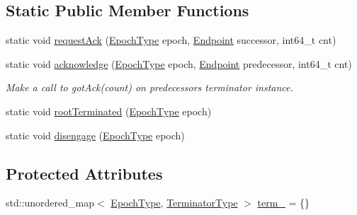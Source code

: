 \subsection*{Static Public Member Functions}
\begin{DoxyCompactItemize}
\item 
static void \hyperlink{structvt_1_1term_1_1ds_1_1_state_d_s_acdf0151492a1e35c6565c65b138e8ac9}{request\+Ack} (\hyperlink{namespacevt_a985a5adf291c34a3ca263b3378388236}{Epoch\+Type} epoch, \hyperlink{structvt_1_1term_1_1ds_1_1_state_d_s_aba302de614dd639f5d93f4f5b6dd6108}{Endpoint} successor, int64\+\_\+t cnt)
\item 
static void \hyperlink{structvt_1_1term_1_1ds_1_1_state_d_s_a60aafca7a5eef1368e55c02508a0f3bf}{acknowledge} (\hyperlink{namespacevt_a985a5adf291c34a3ca263b3378388236}{Epoch\+Type} epoch, \hyperlink{structvt_1_1term_1_1ds_1_1_state_d_s_aba302de614dd639f5d93f4f5b6dd6108}{Endpoint} predecessor, int64\+\_\+t cnt)
\begin{DoxyCompactList}\small\item\em Make a call to got\+Ack(count) on predecessor\textquotesingle{}s terminator instance. \end{DoxyCompactList}\item 
static void \hyperlink{structvt_1_1term_1_1ds_1_1_state_d_s_a26ae9b485dbb46e46b48e73a321cfd8b}{root\+Terminated} (\hyperlink{namespacevt_a985a5adf291c34a3ca263b3378388236}{Epoch\+Type} epoch)
\item 
static void \hyperlink{structvt_1_1term_1_1ds_1_1_state_d_s_a55a5290621f7de06a421793daba374e8}{disengage} (\hyperlink{namespacevt_a985a5adf291c34a3ca263b3378388236}{Epoch\+Type} epoch)
\end{DoxyCompactItemize}
\subsection*{Protected Attributes}
\begin{DoxyCompactItemize}
\item 
std\+::unordered\+\_\+map$<$ \hyperlink{namespacevt_a985a5adf291c34a3ca263b3378388236}{Epoch\+Type}, \hyperlink{structvt_1_1term_1_1ds_1_1_state_d_s_af98cfe31c25f710273ee103026d538e4}{Terminator\+Type} $>$ \hyperlink{structvt_1_1term_1_1ds_1_1_state_d_s_a97a12b9645ebe99171d7680baab34b5d}{term\+\_\+} = \{\}
\end{DoxyCompactItemize}
